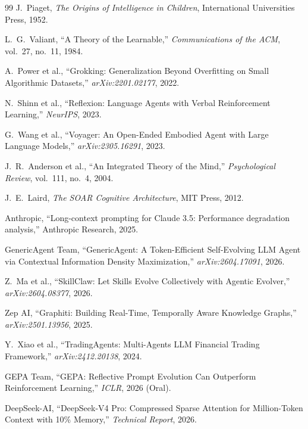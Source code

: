 \documentclass[11pt,a4paper]{article}
\begin{document}
\begin{thebibliography}{99}
 J.~Piaget, \emph{The Origins of Intelligence in
  Children}, International Universities Press, 1952.

 L.~G.~Valiant, ``A Theory of the Learnable,''
  \emph{Communications of the ACM}, vol.~27, no.~11, 1984.

 A.~Power et al., ``Grokking: Generalization Beyond
  Overfitting on Small Algorithmic Datasets,'' \emph{arXiv:2201.02177}, 2022.

 N.~Shinn et al., ``Reflexion: Language Agents with
  Verbal Reinforcement Learning,'' \emph{NeurIPS}, 2023.

 G.~Wang et al., ``Voyager: An Open-Ended Embodied Agent
  with Large Language Models,'' \emph{arXiv:2305.16291}, 2023.

 J.~R.~Anderson et al., ``An Integrated Theory of the Mind,''
  \emph{Psychological Review}, vol.~111, no.~4, 2004.

 J.~E.~Laird, \emph{The SOAR Cognitive Architecture},
  MIT Press, 2012.

 Anthropic, ``Long-context prompting for
  Claude 3.5: Performance degradation analysis,'' Anthropic Research, 2025.

 GenericAgent Team, ``GenericAgent: A Token-Efficient
  Self-Evolving LLM Agent via Contextual Information Density Maximization,''
  \emph{arXiv:2604.17091}, 2026.

 Z.~Ma et al., ``SkillClaw: Let Skills Evolve Collectively
  with Agentic Evolver,'' \emph{arXiv:2604.08377}, 2026.

 Zep AI, ``Graphiti: Building Real-Time, Temporally Aware
  Knowledge Graphs,'' \emph{arXiv:2501.13956}, 2025.

 Y.~Xiao et al., ``TradingAgents: Multi-Agents LLM
  Financial Trading Framework,'' \emph{arXiv:2412.20138}, 2024.

 GEPA Team, ``GEPA: Reflective Prompt Evolution Can Outperform
  Reinforcement Learning,'' \emph{ICLR}, 2026 (Oral).

 DeepSeek-AI, ``DeepSeek-V4 Pro: Compressed Sparse
  Attention for Million-Token Context with 10\% Memory,'' \emph{Technical
  Report}, 2026.

\end{thebibliography}
\end{document}
